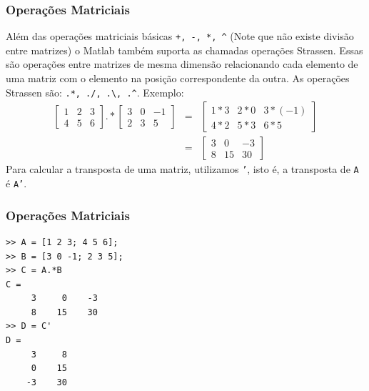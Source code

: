\documentclass{beamer}
\begin{document}
\begin{frame}
\frametitle{Opera\c{c}\~oes Matriciais}

Al\'em das opera\c{c}\~oes matriciais b\'asicas {\tt +, -, *, \textasciicircum} (Note que n\~ao existe divis\~ao entre matrizes) o Matlab tamb\'em suporta as chamadas opera\c{c}\~oes Strassen. Essas s\~ao opera\c{c}\~oes entre matrizes de mesma dimens\~ao relacionando cada elemento de uma matriz com o elemento na posi\c{c}\~ao correspondente da outra. As opera\c{c}\~oes Strassen s\~ao: {\tt .*, ./, .\textbackslash, .\textasciicircum}.
\pause
Exemplo:
\begin{eqnarray*}
\left[
\begin{array}{ccc}
1 & 2 & 3 \\
4 & 5 & 6
\end{array}
\right].*
\left[
\begin{array}{ccc}
3 & 0 & -1 \\
2 & 3 & 5
\end{array}
\right] & = &
\left[
\begin{array}{ccc}
1*3 & 2*0 & 3*(-1) \\
4*2 & 5*3 & 6*5
\end{array}
\right] \\
& = &
\left[
\begin{array}{ccc}
3 & 0 & -3 \\
8 & 15 & 30
\end{array}
\right]
\end{eqnarray*}
\pause
Para calcular a transposta de uma matriz, utilizamos {\tt '}, isto \'e, a transposta de {\tt A} \'e {\tt A'}.
\end{frame}

\begin{frame}[fragile]
\frametitle{Opera\c{c}\~oes Matriciais}
\begin{verbatim}
>> A = [1 2 3; 4 5 6];
>> B = [3 0 -1; 2 3 5];
>> C = A.*B
C =
     3     0    -3
     8    15    30
>> D = C'
D =
     3     8
     0    15
    -3    30
\end{verbatim}
\end{frame}

\subsection[Cria\c{c}\~ao de Vetores]{}
\end{document}

